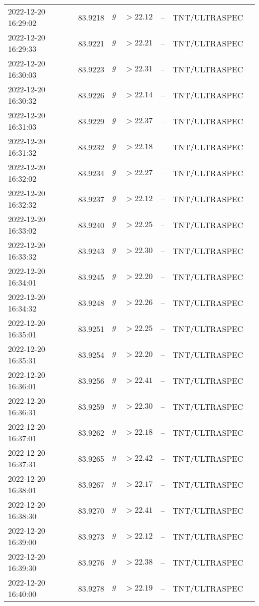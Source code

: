 \documentclass{nature_plusfigure}
\begin{document}
\begin{supplement}
\begin{center}
\begin{longtable}{lllllll}
2022-12-20 16:29:02 & 83.9218 & $g$ & $>22.12$ & -- & TNT/ULTRASPEC &  \\ 
2022-12-20 16:29:33 & 83.9221 & $g$ & $>22.21$ & -- & TNT/ULTRASPEC &  \\ 
2022-12-20 16:30:03 & 83.9223 & $g$ & $>22.31$ & -- & TNT/ULTRASPEC &  \\ 
2022-12-20 16:30:32 & 83.9226 & $g$ & $>22.14$ & -- & TNT/ULTRASPEC &  \\ 
2022-12-20 16:31:03 & 83.9229 & $g$ & $>22.37$ & -- & TNT/ULTRASPEC &  \\ 
2022-12-20 16:31:32 & 83.9232 & $g$ & $>22.18$ & -- & TNT/ULTRASPEC &  \\ 
2022-12-20 16:32:02 & 83.9234 & $g$ & $>22.27$ & -- & TNT/ULTRASPEC &  \\ 
2022-12-20 16:32:32 & 83.9237 & $g$ & $>22.12$ & -- & TNT/ULTRASPEC &  \\ 
2022-12-20 16:33:02 & 83.9240 & $g$ & $>22.25$ & -- & TNT/ULTRASPEC &  \\ 
2022-12-20 16:33:32 & 83.9243 & $g$ & $>22.30$ & -- & TNT/ULTRASPEC &  \\ 
2022-12-20 16:34:01 & 83.9245 & $g$ & $>22.20$ & -- & TNT/ULTRASPEC &  \\ 
2022-12-20 16:34:32 & 83.9248 & $g$ & $>22.26$ & -- & TNT/ULTRASPEC &  \\ 
2022-12-20 16:35:01 & 83.9251 & $g$ & $>22.25$ & -- & TNT/ULTRASPEC &  \\ 
2022-12-20 16:35:31 & 83.9254 & $g$ & $>22.20$ & -- & TNT/ULTRASPEC &  \\ 
2022-12-20 16:36:01 & 83.9256 & $g$ & $>22.41$ & -- & TNT/ULTRASPEC &  \\ 
2022-12-20 16:36:31 & 83.9259 & $g$ & $>22.30$ & -- & TNT/ULTRASPEC &  \\ 
2022-12-20 16:37:01 & 83.9262 & $g$ & $>22.18$ & -- & TNT/ULTRASPEC &  \\ 
2022-12-20 16:37:31 & 83.9265 & $g$ & $>22.42$ & -- & TNT/ULTRASPEC &  \\ 
2022-12-20 16:38:01 & 83.9267 & $g$ & $>22.17$ & -- & TNT/ULTRASPEC &  \\ 
2022-12-20 16:38:30 & 83.9270 & $g$ & $>22.41$ & -- & TNT/ULTRASPEC &  \\ 
2022-12-20 16:39:00 & 83.9273 & $g$ & $>22.12$ & -- & TNT/ULTRASPEC &  \\ 
2022-12-20 16:39:30 & 83.9276 & $g$ & $>22.38$ & -- & TNT/ULTRASPEC &  \\ 
2022-12-20 16:40:00 & 83.9278 & $g$ & $>22.19$ & -- & TNT/ULTRASPEC &  \\ 

\end{longtable}
\end{center}
\end{supplement}
\end{document}
